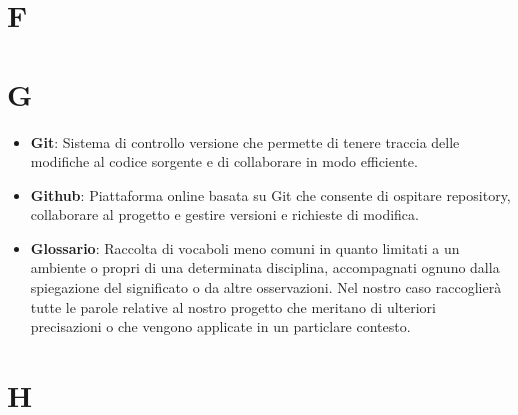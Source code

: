 \documentclass[11pt,a4paper]{article}
\begin{document}
\section*{F}

\newpage

\section*{G}
\begin{itemize}
\item \textbf{Git}: Sistema di controllo versione che permette di tenere traccia delle modifiche al codice sorgente e di collaborare in modo efficiente.

\item \textbf{Github}: Piattaforma online basata su Git che consente di ospitare repository, collaborare al progetto e gestire versioni e richieste di modifica.

\item \textbf{Glossario}: Raccolta di vocaboli meno comuni in quanto limitati a un ambiente o propri di una determinata disciplina, accompagnati ognuno dalla spiegazione del significato o da altre osservazioni. Nel nostro caso raccoglierà tutte le parole relative al nostro progetto che meritano di ulteriori precisazioni o che vengono applicate in un particlare contesto.
\end{itemize}
\newpage

\section*{H}

\newpage
\end{document}
